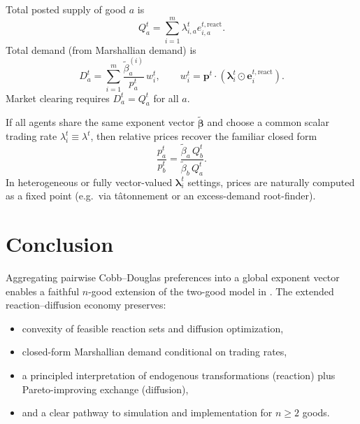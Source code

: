 \documentclass[11pt]{article}
\begin{document}
Total posted supply of good \(a\) is
\[
Q_a^t = \sum_{i=1}^m \lambda_{i,a}^t e_{i,a}^{t,\mathrm{react}}.
\]
Total demand (from Marshallian demand) is
\[
D_a^t = \sum_{i=1}^m \frac{\tilde{\beta}_a^{(i)}}{p_a^t}\,w_i^t,
\qquad
w_i^t=\bm{p}^t\cdot(\bm{\lambda}_i^t\odot\bm{e}_i^{t,\mathrm{react}}).
\]
Market clearing requires \(D_a^t = Q_a^t\) for all \(a\).

If all agents share the same exponent vector \(\tilde{\bm{\beta}}\) and choose a common scalar trading rate
\(\lambda_i^t\equiv\lambda^t\), then relative prices recover the familiar closed form
\[
\frac{p_a^t}{p_b^t}
=
\frac{\tilde{\beta}_a\,Q_b^t}{\tilde{\beta}_b\,Q_a^t}.
\]
In heterogeneous or fully vector-valued \(\bm{\lambda}_i^t\) settings, prices are naturally computed as a fixed point
(e.g.\ via tâtonnement or an excess-demand root-finder).

\section{Conclusion}

Aggregating pairwise Cobb--Douglas preferences into a global exponent vector enables a faithful \(n\)-good extension of
the two-good model in \parencite{Tristain2024}. The extended reaction--diffusion economy preserves:
\begin{itemize}[leftmargin=*]
\item convexity of feasible reaction sets and diffusion optimization,
\item closed-form Marshallian demand conditional on trading rates,
\item a principled interpretation of endogenous transformations (reaction) plus Pareto-improving exchange (diffusion),
\item and a clear pathway to simulation and implementation for \(n\ge 2\) goods.
\end{itemize}

\clearpage
\nocite{CobbDouglas1928,MasColell1995,BoydVandenberghe2004,Varian1992}

\printbibliography
\end{document}
